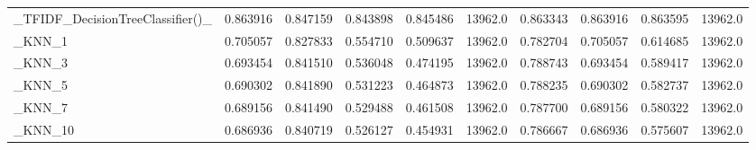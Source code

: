 \begin{tabular}{lrrrrrrrrr}
\_TFIDF\_DecisionTreeClassifier()\_                   &  0.863916 &         0.847159 &      0.843898 &        0.845486 &        13962.0 &            0.863343 &         0.863916 &           0.863595 &           13962.0 \\
\_KNN\_1                                             &  0.705057 &         0.827833 &      0.554710 &        0.509637 &        13962.0 &            0.782704 &         0.705057 &           0.614685 &           13962.0 \\
\_KNN\_3                                             &  0.693454 &         0.841510 &      0.536048 &        0.474195 &        13962.0 &            0.788743 &         0.693454 &           0.589417 &           13962.0 \\
\_KNN\_5                                             &  0.690302 &         0.841890 &      0.531223 &        0.464873 &        13962.0 &            0.788235 &         0.690302 &           0.582737 &           13962.0 \\
\_KNN\_7                                             &  0.689156 &         0.841490 &      0.529488 &        0.461508 &        13962.0 &            0.787700 &         0.689156 &           0.580322 &           13962.0 \\
\_KNN\_10                                            &  0.686936 &         0.840719 &      0.526127 &        0.454931 &        13962.0 &            0.786667 &         0.686936 &           0.575607 &           13962.0 \\
\bottomrule
\end{tabular}
